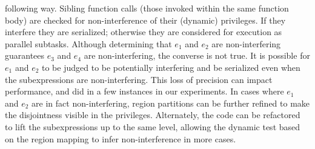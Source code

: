 following way.  Sibling function calls (those invoked within the same
function body) are checked for non-interference of their (dynamic)
privileges.  If they interfere they are serialized; otherwise they are
considered for execution as parallel subtasks.  Although determining that $e_1$
and $e_2$ are non-interfering guarantees $e_3$ and $e_4$ are
non-interfering, the converse is not true.  It is possible for $e_1$
and $e_2$ to be judged to be potentially interfering and be serialized
even when the subexpressions are non-interfering.  This loss of
precision can impact performance, and did in a few instances in our
experiments.  
In cases where $e_1$ and $e_2$ are in fact
non-interfering, region partitions can be further refined to make the
disjointness visible in the privileges.  Alternately, the code can be
refactored to lift the subexpressions up to the same level, allowing
the dynamic test based on the region mapping to infer non-interference
in more cases.  

